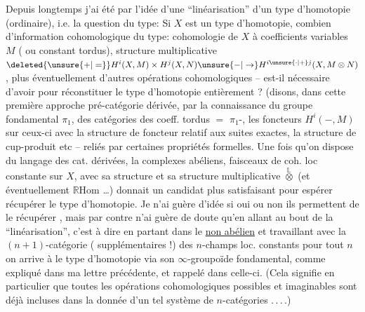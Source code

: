  Depuis longtemps j'ai été  par l'idée d'une ``linéarisation'' d'un type d'homotopie (ordinaire), i.e. la question du type: Si $X$ est un type d'homotopie, combien d'information cohomologique du type: cohomologie de $X$ à coefficients variables $M$ ( ou constant tordus), structure multiplicative $\deleted{\unsure{+|=}}H^i(X,M)\times H^j(X,N)\unsure{-|\to}H^{i\unsure{\cdot|+}j}(X,M\otimes N)$, plus éventuellement d'autres opérations cohomologiques -- est-il nécessaire d'avoir pour réconstituer le type d'homotopie entièrement ? (disons,
dans cette première approche pré-catégorie dérivée, par la connaissance du groupe fondamental $\pi_1$,  des catégories des coeff.  tordus $=$ $\pi_1$-, les foncteurs $H^i(-,M)$ sur ceux-ci avec la structure de foncteur   relatif aux suites exactes, la structure de cup-produit etc -- reliés par certaines propriétés formelles. Une fois qu'on dispose du langage des cat. dérivées, la  complexes abéliens,   faisceaux de coh. loc constante sur $X$, avec sa structure  et sa structure multiplicative $\overset{\mathbb{L}}{\otimes}$ (et éventuellement $\mathbb{R}\mathrm{Hom}$ \ldots) donnait un candidat plus satisfaisant pour espérer récupérer le type d'homotopie. Je n'ai guère d'idée si oui ou non ils permettent de le récupérer , mais par contre n'ai guère de doute qu'en allant au bout de la ``linéarisation'', c'est à dire en partant dans le \uline{non abélien} et travaillant avec la $(n+1)$-catégorie (  supplémentaires !) des $n$-champs loc. constants  pour tout $n$
on arrive à  le type d'homotopie via son $\infty$-groupoïde fondamental, comme expliqué dans ma lettre précédente, et rappelé dans celle-ci. (Cela signifie en particulier que toutes les opérations cohomologiques possibles et imaginables sont déjà incluses dans la donnée d'un tel système de $n$-catégories .\,.\,.\,.) 

